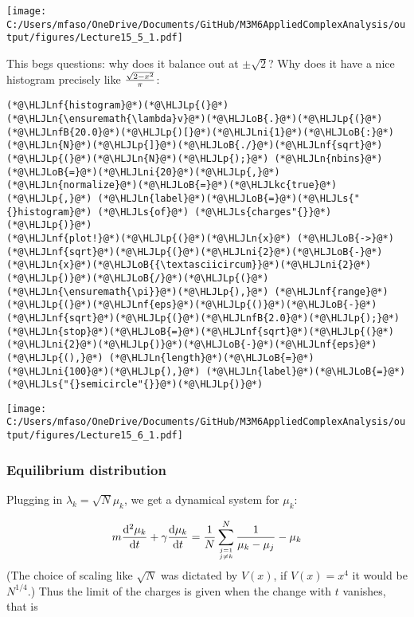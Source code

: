 \documentclass[12pt,landscape]{article}
\newcommand{\HLJLkc}[1]{\textcolor[RGB]{59,151,46}{\textit{#1}}}
\newcommand{\HLJLn}[1]{#1}
\newcommand{\HLJLnf}[1]{\textcolor[RGB]{66,102,213}{#1}}
\newcommand{\HLJLs}[1]{\textcolor[RGB]{201,61,57}{#1}}
\newcommand{\HLJLnfB}[1]{\textcolor[RGB]{59,151,46}{#1}}
\newcommand{\HLJLni}[1]{\textcolor[RGB]{59,151,46}{#1}}
\newcommand{\HLJLoB}[1]{\textcolor[RGB]{102,102,102}{\textbf{#1}}}
\newcommand{\HLJLp}[1]{#1}
\def\D{ {\rm d} }
\def\cent#1{\begin{center}#1\end{center} }
\begin{document}
{\cent{\texttt{[image: C:/Users/mfaso/OneDrive/Documents/GitHub/M3M6AppliedComplexAnalysis/output/figures/Lecture15\_5\_1.pdf]}}

This begs questions: why does it balance out at $\pm \sqrt 2$?  Why does it have a nice histogram precisely like ${\sqrt{2-x^2} \over \pi}$:


\begin{lstlisting}
(*@\HLJLnf{histogram}@*)(*@\HLJLp{(}@*)(*@\HLJLn{\ensuremath{\lambda}v}@*)(*@\HLJLoB{.}@*)(*@\HLJLp{(}@*)(*@\HLJLnfB{20.0}@*)(*@\HLJLp{)[}@*)(*@\HLJLni{1}@*)(*@\HLJLoB{:}@*)(*@\HLJLn{N}@*)(*@\HLJLp{]}@*)(*@\HLJLoB{./}@*)(*@\HLJLnf{sqrt}@*)(*@\HLJLp{(}@*)(*@\HLJLn{N}@*)(*@\HLJLp{);}@*) (*@\HLJLn{nbins}@*)(*@\HLJLoB{=}@*)(*@\HLJLni{20}@*)(*@\HLJLp{,}@*) (*@\HLJLn{normalize}@*)(*@\HLJLoB{=}@*)(*@\HLJLkc{true}@*)(*@\HLJLp{,}@*) (*@\HLJLn{label}@*)(*@\HLJLoB{=}@*)(*@\HLJLs{"{}histogram}@*) (*@\HLJLs{of}@*) (*@\HLJLs{charges"{}}@*)(*@\HLJLp{)}@*)
(*@\HLJLnf{plot!}@*)(*@\HLJLp{(}@*)(*@\HLJLn{x}@*) (*@\HLJLoB{->}@*) (*@\HLJLnf{sqrt}@*)(*@\HLJLp{(}@*)(*@\HLJLni{2}@*)(*@\HLJLoB{-}@*)(*@\HLJLn{x}@*)(*@\HLJLoB{{\textasciicircum}}@*)(*@\HLJLni{2}@*)(*@\HLJLp{)}@*)(*@\HLJLoB{/}@*)(*@\HLJLp{(}@*)(*@\HLJLn{\ensuremath{\pi}}@*)(*@\HLJLp{),}@*) (*@\HLJLnf{range}@*)(*@\HLJLp{(}@*)(*@\HLJLnf{eps}@*)(*@\HLJLp{()}@*)(*@\HLJLoB{-}@*)(*@\HLJLnf{sqrt}@*)(*@\HLJLp{(}@*)(*@\HLJLnfB{2.0}@*)(*@\HLJLp{);}@*) (*@\HLJLn{stop}@*)(*@\HLJLoB{=}@*)(*@\HLJLnf{sqrt}@*)(*@\HLJLp{(}@*)(*@\HLJLni{2}@*)(*@\HLJLp{)}@*)(*@\HLJLoB{-}@*)(*@\HLJLnf{eps}@*)(*@\HLJLp{(),}@*) (*@\HLJLn{length}@*)(*@\HLJLoB{=}@*)(*@\HLJLni{100}@*)(*@\HLJLp{),}@*) (*@\HLJLn{label}@*)(*@\HLJLoB{=}@*)(*@\HLJLs{"{}semicircle"{}}@*)(*@\HLJLp{)}@*)
\end{lstlisting}

\cent{\texttt{[image: C:/Users/mfaso/OneDrive/Documents/GitHub/M3M6AppliedComplexAnalysis/output/figures/Lecture15\_6\_1.pdf]}}

\subsubsection{Equilibrium distribution}
Plugging in $\lambda_k = \sqrt N \mu_k$, we get a dynamical system for $\mu_k$:

\[
 m {\D^2  \mu_k \over \D t} + \gamma {\D  \mu_k \over \D t}= {1 \over N} \sum_{j=1 \atop j \neq k}^N {1 \over \mu_k -\mu_j} -  \mu_k
\]
(The choice of scaling like $\sqrt N$ was dictated by $V(x)$, if $V(x) = x^4$ it would be $N^{1/4}$.) Thus the limit of the charges is given when the change with $t$ vanishes, that is

}
\end{document}
